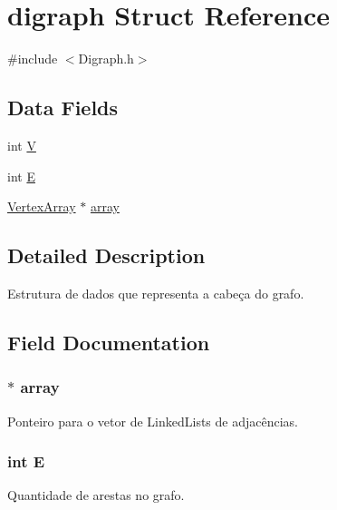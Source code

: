 \hypertarget{structdigraph}{}\section{digraph Struct Reference}
\label{structdigraph}


{\ttfamily \#include $<$Digraph.\+h$>$}

\subsection*{Data Fields}
\begin{DoxyCompactItemize}
\item 
int \hyperlink{structdigraph_a91e334f289dc11ba09da0df4a9c72123}{V}
\item 
int \hyperlink{structdigraph_a105a63272424d04208f33bac739acf98}{E}
\item 
\hyperlink{_digraph_8h_a34d078088dd1f710e4034c3fcb21918e}{Vertex\+Array} $\ast$ \hyperlink{structdigraph_af3759f34fe0a4cdbdbf6f6135e6c9cbe}{array}
\end{DoxyCompactItemize}


\subsection{Detailed Description}
Estrutura de dados que representa a cabeça do grafo. 

\subsection{Field Documentation}
\subsubsection[{\texorpdfstring{array}{array}}]{$\ast$ array}\hypertarget{structdigraph_af3759f34fe0a4cdbdbf6f6135e6c9cbe}{}\label{structdigraph_af3759f34fe0a4cdbdbf6f6135e6c9cbe}
Ponteiro para o vetor de Linked\+Lists de adjacências. 
\subsubsection[{\texorpdfstring{E}{E}}]{\setlength{\rightskip}{0pt plus 5cm}int E}\hypertarget{structdigraph_a105a63272424d04208f33bac739acf98}{}\label{structdigraph_a105a63272424d04208f33bac739acf98}
Quantidade de arestas no grafo. 
